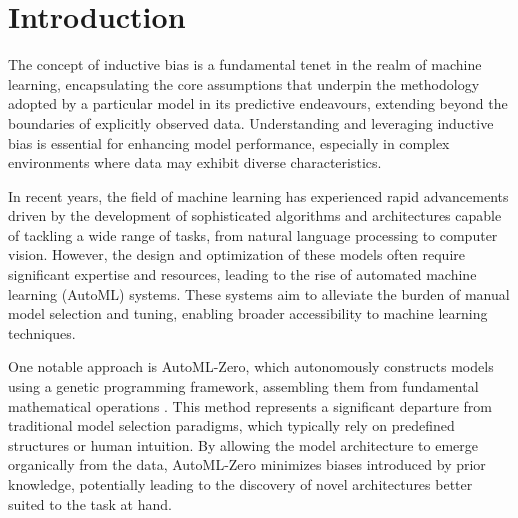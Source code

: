 \documentclass{article}
\begin{document}
\begin{abstract}

\end{abstract}


\section{Introduction} 
The concept of inductive bias is a fundamental tenet in the realm of machine learning, encapsulating the core assumptions that underpin the methodology adopted by a particular model in its predictive endeavours, extending beyond the boundaries of explicitly observed data. Understanding and leveraging inductive bias is essential for enhancing model performance, especially in complex environments where data may exhibit diverse characteristics. 

In recent years, the field of machine learning has experienced rapid advancements driven by the development of sophisticated algorithms and architectures capable of tackling a wide range of tasks, from natural language processing to computer vision. However, the design and optimization of these models often require significant expertise and resources, leading to the rise of automated machine learning (AutoML) systems. These systems aim to alleviate the burden of manual model selection and tuning, enabling broader accessibility to machine learning techniques.

One notable approach is AutoML-Zero, which autonomously constructs models using a genetic programming framework, assembling them from fundamental mathematical operations \citep{automl-zero}. This method represents a significant departure from traditional model selection paradigms, which typically rely on predefined structures or human intuition. By allowing the model architecture to emerge organically from the data, AutoML-Zero minimizes biases introduced by prior knowledge, potentially leading to the discovery of novel architectures better suited to the task at hand.
\end{document}
